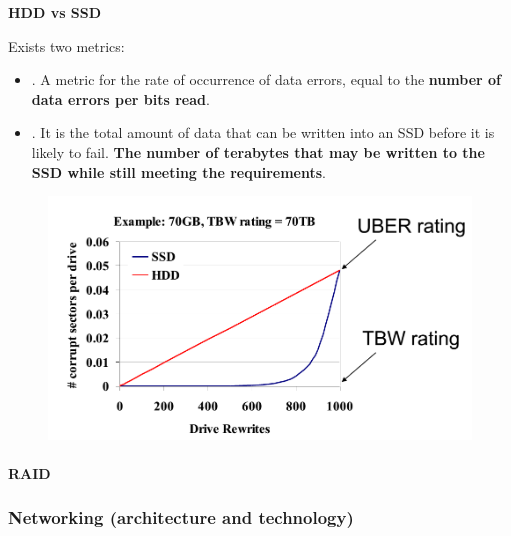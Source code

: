 \begin{flushleft}
    \textcolor{Red2}{\textbf{HDD vs SSD}}
\end{flushleft}
Exists two metrics:
\begin{itemize}
    \item {}. A metric for the rate of occurrence of data errors, equal to the \textbf{number of data errors per bits read}.
    
    \item {}. It is the total amount of data that can be written into an SSD before it is likely to fail. \textbf{The number of terabytes that may be written to the SSD while still meeting the requirements}.
\end{itemize}
\begin{figure}[!htp]
    \centering
    \includegraphics[width=.7\textwidth]{img/hdd-vs-ssd.png}
\end{figure}


\newpage

\paragraph{RAID}

\subsubsection{Networking (architecture and technology)}\label{subsubsection: Networking (architecture and technology)}
